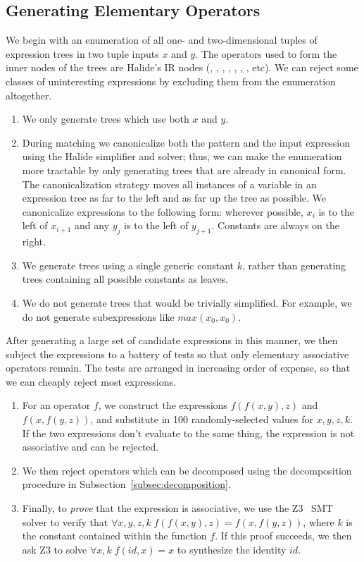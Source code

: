 \subsection{Generating Elementary Operators}
\label{subsec:generation}

We begin with an enumeration of all one- and two-dimensional tuples of expression trees in two tuple inputs $x$ and $y$. The operators used to form the inner nodes of the trees are Halide's IR nodes (\code{*}, \code{+}, \code{-}, , , , \code{<}, etc). We can reject some classes of uninteresting expressions by excluding them from the enumeration altogether.

\begin{enumerate}
\item We only generate trees which use both $x$ and $y$.
\item During matching we canonicalize both the pattern and the input expression using the Halide simplifier and solver; thus, we can make the enumeration more tractable by only generating trees that are already in canonical form.  The canonicalization strategy moves all instances of a variable in an expression tree as far to the left and as far up the tree as possible. We canonicalize expressions to the following form: wherever possible, $x_i$ is to the left of $x_{i+1}$ and any $y_j$ is to the left of $y_{j+1}$. Constants are always on the right.
\item We generate trees using a single generic constant $k$, rather than generating trees containing all possible constants as leaves.
\item We do not generate trees that would be trivially simplified. For example, we do not generate subexpressions like $max(x_0, x_0)$.
\end{enumerate}

After generating a large set of candidate expressions in this manner, we then subject the expressions to a battery of tests so that only elementary associative operators remain. The tests are arranged in increasing order of expense, so that we can cheaply reject most expressions.

\begin{enumerate}
\item For an operator $f$, we construct the expressions $f(f(x, y), z)$ and $f(x, f(y, z))$, and substitute in 100 randomly-selected values for $x, y, z, k$. If the two expressions don't evaluate to the same thing, the expression is not associative and can be rejected.
\item We then reject operators which can be decomposed using the decomposition procedure in Subsection~\ref{subsec:decomposition}.
\item Finally, to \emph{prove} that the expression is associative, we use the Z3~\cite{DeMoura:2008:ZES:1792734.1792766} SMT solver to verify that $\forall x, y, z, k \;f(f(x, y), z) = f(x, f(y, z))$, where $k$ is the constant contained within the function $f$. If this proof succeeds, we then ask Z3 to solve $\forall x, k \;f(id, x) = x$ to synthesize the identity $id$.
\end{enumerate}

